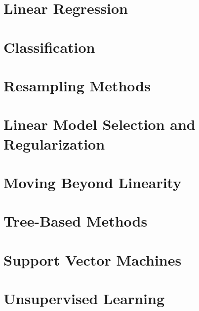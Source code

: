 \documentclass[12pt,a4paper]{article}
\begin{document}
\section{Linear Regression}
\section{Classification}
\section{Resampling Methods}
\section{Linear Model Selection and Regularization}
\section{Moving Beyond Linearity}
\section{Tree-Based Methods}
\section{Support Vector Machines}
\section{Unsupervised Learning}
\end{document}
